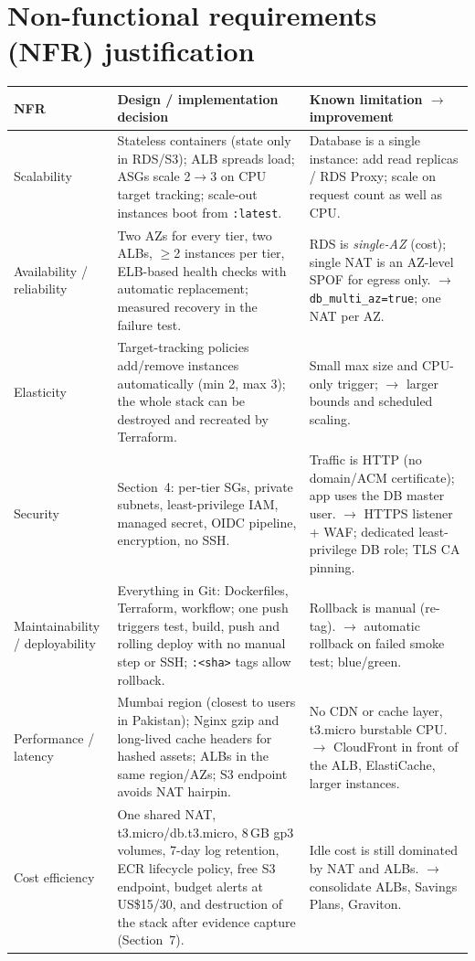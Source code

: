 \documentclass[10pt,a4paper]{article}
\begin{document}
\section{Non-functional requirements (NFR) justification}
\begin{table}[ht]
\centering\footnotesize
\begin{tabularx}{\textwidth}{@{}L{2.0cm} X X@{}}
\toprule
\textbf{NFR} & \textbf{Design / implementation decision} & \textbf{Known limitation $\to$ improvement}\\
\midrule
Scalability & Stateless containers (state only in RDS/S3); ALB spreads load; ASGs scale 2$\to$3 on CPU target tracking; scale-out instances boot from \texttt{:latest}. & Database is a single instance: add read replicas / RDS Proxy; scale on request count as well as CPU.\\
Availability / reliability & Two AZs for every tier, two ALBs, $\geq$2 instances per tier, ELB-based health checks with automatic replacement; measured recovery in the failure test. & RDS is \emph{single-AZ} (cost); single NAT is an AZ-level SPOF for egress only. $\to$ \texttt{db\_multi\_az=true}; one NAT per AZ.\\
Elasticity & Target-tracking policies add/remove instances automatically (min 2, max 3); the whole stack can be destroyed and recreated by Terraform. & Small max size and CPU-only trigger; $\to$ larger bounds and scheduled scaling.\\
Security & Section~4: per-tier SGs, private subnets, least-privilege IAM, managed secret, OIDC pipeline, encryption, no SSH. & Traffic is HTTP (no domain/ACM certificate); app uses the DB master user. $\to$ HTTPS listener + WAF; dedicated least-privilege DB role; TLS CA pinning.\\
Maintainability / deployability & Everything in Git: Dockerfiles, Terraform, workflow; one push triggers test, build, push and rolling deploy with no manual step or SSH; \texttt{:<sha>} tags allow rollback. & Rollback is manual (re-tag). $\to$ automatic rollback on failed smoke test; blue/green.\\
Performance / latency & Mumbai region (closest to users in Pakistan); Nginx gzip and long-lived cache headers for hashed assets; ALBs in the same region/AZs; S3 endpoint avoids NAT hairpin. & No CDN or cache layer, t3.micro burstable CPU. $\to$ CloudFront in front of the ALB, ElastiCache, larger instances.\\
Cost efficiency & One shared NAT, t3.micro/db.t3.micro, 8\,GB gp3 volumes, 7-day log retention, ECR lifecycle policy, free S3 endpoint, budget alerts at US\$15/30, and destruction of the stack after evidence capture (Section~7). & Idle cost is still dominated by NAT and ALBs. $\to$ consolidate ALBs, Savings Plans, Graviton.\\

\end{tabularx}
\end{table}
\end{document}
